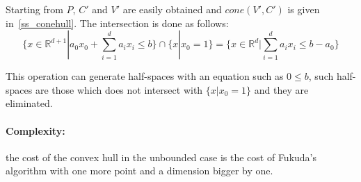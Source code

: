 Starting from $P$, $C'$ and $V'$ are easily obtained and $cone(V',C')$ is given in~\ref{ss_conehull}. The intersection is done as follows:
$$ \{ x\in \mathbb{R}^{d+1}| a_0x_0+\sum_{i=1}^da_ix_i\leq b\}\cap \{x|x_0=1\}=\{x\in \mathbb{R}^d|\sum_{i=1}^da_ix_i\leq b-a_0\}$$

This operation can generate half-spaces with an equation such as $0\leq b$, such half-spaces are those which does not intersect with $\{x|x_0=1\}$ and they are eliminated.

\paragraph{Complexity:} the cost of the convex hull in the unbounded case is the cost of Fukuda's algorithm with one more point and a dimension bigger by one.



